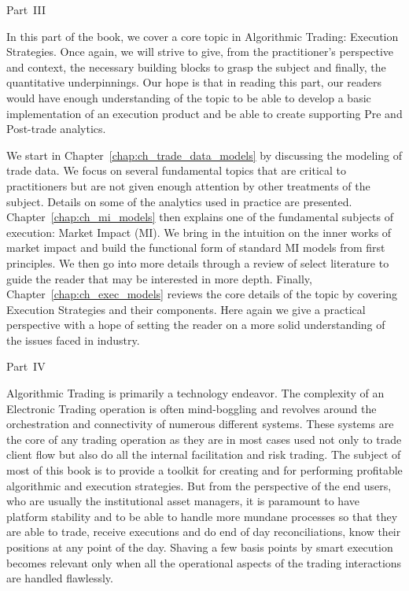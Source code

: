 \noindent Part~III \par\vspace{2\baselineskip}

In this part of the book, we cover a core topic in Algorithmic Trading: Execution Strategies. Once again, we will strive to give, from the practitioner's perspective and context, the necessary building blocks to grasp the subject and finally, the quantitative underpinnings. Our hope is that in reading this part, our readers would have enough understanding of the topic to be able to develop a basic implementation of an execution product and be able to create supporting Pre and Post-trade analytics.


We start in Chapter~\ref{chap:ch_trade_data_models} by discussing the modeling of trade data. We focus on several fundamental topics that are critical to practitioners but are not given enough attention by other treatments of the subject. Details on some of the analytics used in practice are presented. Chapter~\ref{chap:ch_mi_models} then explains one of the fundamental subjects of execution: Market Impact (MI). We bring in the intuition on the inner works of market impact and build the functional form of standard MI models from first principles. We then go into more details through a review of select literature to guide the reader that may be interested in more depth. Finally, Chapter~\ref{chap:ch_exec_models} reviews the core details of the topic by covering Execution Strategies and their components. Here again we give a practical perspective with a hope of setting the reader on a more solid understanding of the issues faced in industry.



\noindent Part~IV \par\vspace{2\baselineskip}

Algorithmic Trading is primarily a technology endeavor. The complexity of an Electronic Trading operation is often mind-boggling and revolves around the orchestration and connectivity of numerous different systems. These systems are the core of any trading operation as they are in most cases used not only to trade client flow but also do all the internal facilitation and risk trading. The subject of most of this book is to provide a toolkit for creating and for performing profitable algorithmic and execution strategies. But from the perspective of the end users, who are usually the institutional asset managers, it is paramount to have platform stability and to be able to handle more mundane processes so that they are able to trade, receive executions and do end of day reconciliations, know their positions at any point of the day. Shaving a few basis points by smart execution becomes relevant only when all the operational aspects of the trading interactions are handled flawlessly.


